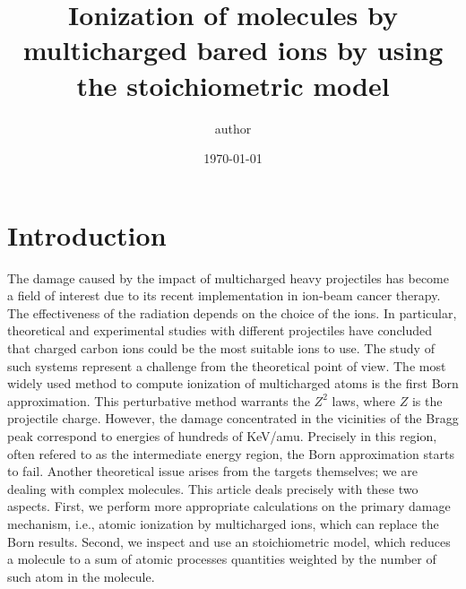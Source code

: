 \documentclass[preprint,12pt]{article}
\begin{document}
\title{Ionization of molecules by multicharged bared ions by using the
stoichiometric model}
\author{author}
\date{\today }

\maketitle

\begin{abstract}
\end{abstract}


\section{Introduction}

The damage caused by the impact of multicharged heavy projectiles has 
become a field of interest due to its recent implementation in ion-beam 
cancer therapy. The effectiveness of the radiation depends on the 
choice of the ions. In particular, theoretical and experimental studies 
with different projectiles have concluded that charged carbon ions 
could be the most suitable ions to use. The study of such systems 
represent a challenge from the theoretical point of view. The most 
widely used method to compute ionization of multicharged atoms is the 
first Born approximation. 
This perturbative method warrants the $Z^{2}$ laws, where $Z$ is the 
projectile charge. However, the damage concentrated in the vicinities 
of the Bragg peak correspond to energies of hundreds of KeV/amu. 
Precisely in this region, often refered to as the intermediate energy 
region, the Born approximation starts to fail. Another theoretical 
issue arises from the targets themselves; we are dealing with complex 
molecules. This article deals precisely with these two aspects. 
First, we perform more appropriate calculations on the primary damage 
mechanism, i.e., atomic ionization by multicharged ions, which can 
replace the Born results. Second, we inspect and use an stoichiometric 
model, which reduces a molecule to a sum of atomic processes quantities 
weighted by the number of such atom in the molecule.
\end{document}

